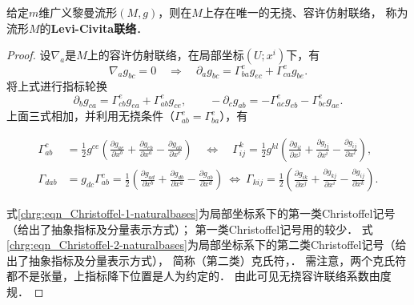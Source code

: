 \begin{theorem}\label{chrg:thm_Levi-Civita-Connetion}
    给定$m$维广义黎曼流形$(M,g)$，则在$M$上存在唯一的无挠、容许仿射联络，
    称为流形$M$的{\bfseries \heiti Levi-Civita联络}．
\end{theorem}
\begin{proof}
    设$\nabla_a$是$M$上的容许仿射联络，在局部坐标$(U;x^i)$下，有
    \begin{equation} \label{chrg:eqn_Dg=0}
        \nabla_a g_{bc} =0  {\quad \Rightarrow \quad }
        \partial_a g_{bc} = \Gamma_{ba}^e g_{ec} + \Gamma_{ca}^e g_{be} .
    \end{equation}
    将上式进行指标轮换
    \begin{equation*}
        \partial_b g_{ca} = \Gamma_{cb}^e g_{ea} + \Gamma_{ab}^e g_{ce}, \qquad
        -\partial_c g_{ab} = -\Gamma_{ac}^e g_{eb} - \Gamma_{bc}^e g_{ae}  .
    \end{equation*}
    上面三式相加，并利用无挠条件（$\Gamma_{ab}^e=\Gamma_{ba}^e$），有
    \begin{small}     %
    \begin{subequations}\label{chrg:eqn_Christoffel-naturalbases}
        \begin{align}
            \Gamma_{ab}^c &= \frac{1}{2}g^{ce}\left(
                  \frac{\partial g_{ae}}{\partial x^b}
                + \frac{\partial g_{eb}}{\partial x^a}
                - \frac{\partial g_{ab}}{\partial x^e} \right)
                {\quad \Leftrightarrow \quad}
            \Gamma_{ij}^k = \frac{1}{2}{g^{kl}}\left(
                  \frac{\partial g_{il}}{\partial x^j}
                + \frac{\partial g_{lj}}{\partial x^i}
                - \frac{\partial g_{ij}}{\partial x^l} \right),
            \label{chrg:eqn_Christoffel-2-naturalbases} \\
            \Gamma _{dab} &= {g_{dc}}\Gamma _{ab}^c = \frac{1}{2}\left(
                  \frac{\partial g_{ad}}{\partial x^b}
                + \frac{\partial g_{db}}{\partial x^a}
                - \frac{\partial g_{ab}}{\partial x^d} \right)
               {\  \Leftrightarrow \   }
            \Gamma _{kij} = \frac{1}{2}\left(
                  \frac{\partial g_{ik}}{\partial x^j}
                + \frac{\partial g_{kj}}{\partial x^i}
                - \frac{\partial g_{ij}}{\partial x^k} \right) .
            \label{chrg:eqn_Christoffel-1-naturalbases}
        \end{align}
    \end{subequations}    %
    \end{small}
    式\eqref{chrg:eqn_Christoffel-1-naturalbases}为局部坐标系下的第一类Christoffel记号（给出了抽象指标及分量表示方式）；
    第一类Christoffel记号用的较少．
    式\eqref{chrg:eqn_Christoffel-2-naturalbases}为局部坐标系下的第二类Christoffel记号（给出了抽象指标及分量表示方式），
    简称（第二类）克氏符，．
    需注意，两个克氏符都不是张量，上指标降下位置是人为约定的．
    由此可见无挠容许联络系数由度规．
    

\end{proof}
